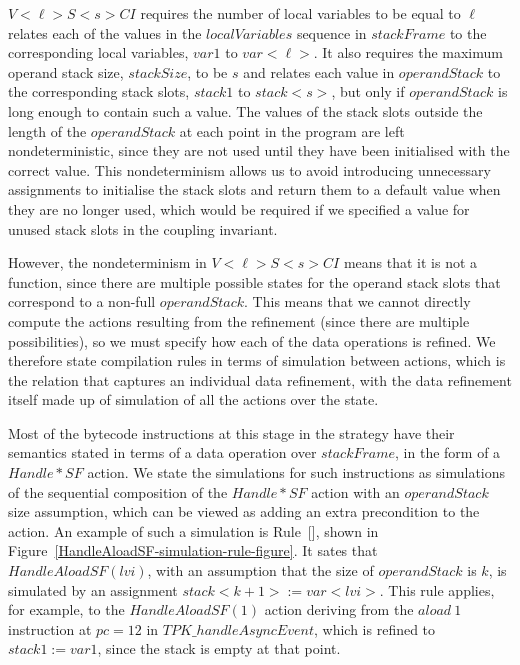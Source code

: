 $V{<}\ell{>}S{<}s{>}CI$ requires the number of local variables to be
equal to $\ell$ relates each of the values in the $localVariables$
sequence in $stackFrame$ to the corresponding local variables, $var1$
to $var{<}\ell{>}$.
It also requires the maximum operand stack size, $stackSize$, to be
$s$ and relates each value in $operandStack$ to the corresponding
stack slots, $stack1$ to $stack{<}s{>}$, but only if $operandStack$ is
long enough to contain such a value.
The values of the stack slots outside the length of the $operandStack$
at each point in the program are left nondeterministic, since they are
not used until they have been initialised with the correct value.
This nondeterminism allows us to avoid introducing unnecessary
assignments to initialise the stack slots and return them to a default
value when they are no longer used, which would be required if we
specified a value for unused stack slots in the coupling invariant.

However, the nondeterminism in $V{<}\ell{>}S{<}s{>}CI$ means that it
is not a function, since there are multiple possible states for the
operand stack slots that correspond to a non-full $operandStack$.
This means that we cannot directly compute the actions resulting from
the refinement (since there are multiple possibilities), so we must
specify how each of the data operations is refined.
We therefore state compilation rules in terms of \Circus{} simulation
between actions, which is the relation that captures an individual
data refinement, with the data refinement itself made up of simulation
of all the actions over the state.

Most of the bytecode instructions at this stage in the strategy have
their semantics stated in terms of a data operation over $stackFrame$,
in the form of a $Handle*SF$ action.
We state the simulations for such instructions as simulations of the
sequential composition of the $Handle*SF$ action with an
$operandStack$ size assumption, which can be viewed as adding an extra
precondition to the action.
An example of such a simulation is
Rule~[], shown in
Figure~\ref{HandleAloadSF-simulation-rule-figure}.
It sates that $HandleAloadSF(lvi)$, with an assumption that the size
of $operandStack$ is $k$, is simulated by an assignment
$stack{<}k+1{>} := var{<}lvi{>}$.
This rule applies, for example, to the $HandleAloadSF(1)$ action
deriving from the $aload~1$ instruction at $pc = 12$ in
$TPK\_handleAsyncEvent$, which is refined to $stack1 := var1$, since
the stack is empty at that point.

